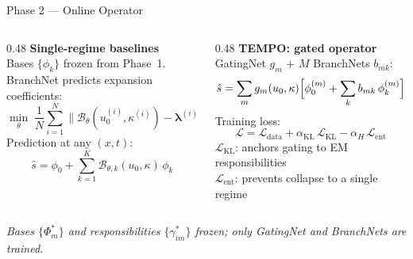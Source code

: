 \documentclass[aspectratio=169]{beamer}
\begin{document}
\begin{frame}{Phase 2 — Online Operator}

\begin{columns}[T]
\begin{column}{0.48\textwidth}
  \small\textbf{Single-regime baselines}\\[6pt]

  Bases $\{\phi_k\}$ frozen from Phase~1.\\[4pt]
  BranchNet predicts expansion coefficients:
  \[
    \min_\theta\;\frac{1}{N}\sum_{i=1}^N
    \bigl\|\mathcal{B}_\theta(u_0^{(i)},\kappa^{(i)}) - \boldsymbol{\lambda}^{(i)}\bigr\|^2
  \]
  Prediction at any $(x,t)$:
  \[
    \hat{s} = \phi_0 + \sum_{k=1}^K \mathcal{B}_{\theta,k}(u_0,\kappa)\,\phi_k
  \]
\end{column}
\begin{column}{0.48\textwidth}
  \small\textbf{TEMPO: gated operator}\\[6pt]

  GatingNet $g_m$ $+$ $M$ BranchNets $b_{mk}$:
  \[
    \hat{s} = \sum_m g_m(u_0,\kappa)
    \Bigl[\phi_0^{(m)} + \sum_k b_{mk}\,\phi_k^{(m)}\Bigr]
  \]
  Training loss:
  \[
    \mathcal{L} = \mathcal{L}_{\text{data}}
    + \alpha_{\text{KL}}\,\mathcal{L}_{\text{KL}}
    - \alpha_H\,\mathcal{L}_{\text{ent}}
  \]
  {\footnotesize
  $\mathcal{L}_{\text{KL}}$: anchors gating to EM responsibilities\\
  $\mathcal{L}_{\text{ent}}$: prevents collapse to a single regime}
\end{column}
\end{columns}

\vspace{0.1cm}
{\footnotesize\itshape Bases $\{\Phi_m^*\}$ and responsibilities $\{\gamma_{im}^*\}$ frozen; only GatingNet and BranchNets are trained.}

\end{frame}
\end{document}
